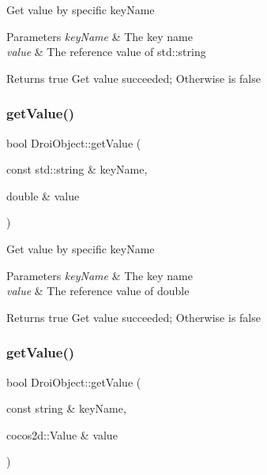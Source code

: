 Get value by specific key\+Name 
\begin{DoxyParams}{Parameters}
{\em key\+Name} & The key name \\
\hline
{\em value} & The reference value of std\+::string \\
\hline
\end{DoxyParams}
\begin{DoxyReturn}{Returns}
true Get value succeeded; Otherwise is false 
\end{DoxyReturn}
\mbox{\label{class_droi_object_a4a48ba8c515eef9e691eaaa57ac9dc34}} 
\subsubsection{\texorpdfstring{get\+Value()}{getValue()}\hspace{0.1cm}{\footnotesize\ttfamily [4/11]}}
{\footnotesize\ttfamily bool Droi\+Object\+::get\+Value (\begin{DoxyParamCaption}\item[{const std\+::string \&}]{key\+Name,  }\item[{double \&}]{value }\end{DoxyParamCaption})}

Get value by specific key\+Name 
\begin{DoxyParams}{Parameters}
{\em key\+Name} & The key name \\
\hline
{\em value} & The reference value of double \\
\hline
\end{DoxyParams}
\begin{DoxyReturn}{Returns}
true Get value succeeded; Otherwise is false 
\end{DoxyReturn}
\mbox{\label{class_droi_object_ac02151ba569b1a7b452c7f5125bbf72b}} 
\subsubsection{\texorpdfstring{get\+Value()}{getValue()}\hspace{0.1cm}{\footnotesize\ttfamily [5/11]}}
{\footnotesize\ttfamily bool Droi\+Object\+::get\+Value (\begin{DoxyParamCaption}\item[{const string \&}]{key\+Name,  }\item[{cocos2d\+::\+Value \&}]{value }\end{DoxyParamCaption})}

